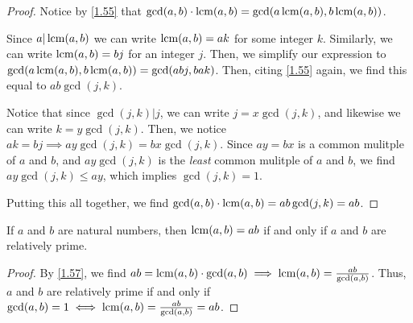 \documentclass[../main.tex]{subfiles}
\begin{document}
\begin{proof}
  Notice by \ref{1.55} that $\gcd (a, b) \cdot \operatorname{lcm} (a, b) = \gcd (a \operatorname{lcm} (a, b), b \operatorname{lcm} (a, b))$.

  Since $a | \operatorname{lcm} (a,b)$ we can write $\operatorname{lcm} (a, b) = ak$ for some integer $k$. Similarly, we can write $\operatorname{lcm} (a, b) = bj$ for an integer $j$. Then, we simplify our expression to $\gcd (a \operatorname{lcm} (a, b), b \operatorname{lcm} (a, b)) = \gcd( abj, bak)$. Then, citing \ref{1.55} again, we find this equal to $ab \gcd(j, k)$.

  Notice that since $\gcd (j, k) | j$, we can write $j = x \gcd(j, k)$, and likewise we can write $k = y \gcd (j, k)$. Then, we notice $ak = bj \implies ay \gcd (j, k) = bx \gcd(j, k)$. Since $ay = bx$ is a common mulitple of $a$ and $b$, and $ay \gcd (j, k)$ is the \emph{least} common mulitple of $a$ and $b$, we find $ay \gcd (j, k) \leq ay$, which implies $\gcd (j, k) = 1$.

  Putting this all together, we find $\gcd (a, b) \cdot \operatorname{lcm} (a, b) = ab \gcd (j, k) = ab$.
\end{proof}



\begin{cor} \label{1.58}
  If $a$ and $b$ are natural numbers, then $\operatorname{lcm} (a, b) = ab$ if and only if $a$ and $b$ are relatively prime.
\end{cor}

\begin{proof}
  By \ref{1.57}, we find $ab = \operatorname{lcm} (a, b)  \cdot \gcd (a, b) \implies \operatorname{lcm} (a, b) = \frac{ab}{\gcd(a, b)}$. Thus, $a$ and $b$ are relatively prime if and only if $\gcd (a, b) = 1 \iff \operatorname{lcm} (a, b) = \frac{ab}{\gcd (a, b)} = ab$.
\end{proof}
\end{document}
